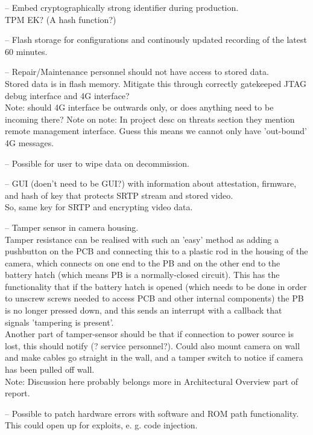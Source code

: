 \documentclass[10pt]{article}
\newenvironment{checklist}{%
  \begin{list}{}{}%
  \let\olditem\item
  \renewcommand\item{\olditem -- \marginpar{$\Box$} }
  \newcommand\checkeditem{\olditem -- \marginpar{$\CheckedBox$} }
}{%
  \end{list}
}
\begin{document}
\begin{checklist}
{      }
      \item{Embed cryptographically strong identifier during production. \\
	TPM EK? (A hash function?)}
      \item{Flash storage for configurations and continously updated recording of the latest 60 minutes.} %
      \item{Repair/Maintenance personnel should not have access to stored data. \\
	Stored data is in flash memory. Mitigate this through correctly gatekeeped JTAG debug interface and 4G interface? \\
	Note: should 4G interface be outwards only, or does anything need to be incoming there?
	Note on note: In project desc on threats section they mention remote management interface. Guess this means we cannot only have 'out-bound' 4G messages.}
      \item{Possible for user to wipe data on decommission.}
      \item{GUI (doen't need to be GUI?) with information about attestation, firmware, and hash of key
        that protects SRTP stream and stored video.\\
	So, same key for SRTP and encrypting video data.}
      \item{Tamper sensor in camera housing. \\
	Tamper resistance can be realised with such an 'easy' method as adding a pushbutton on the PCB and connecting this to a plastic rod in the housing of the camera,
	which connects on one end to the PB and on the other end to the battery hatch (which means PB is a normally-closed circuit). This has the functionality that if
	the battery hatch is opened (which needs to be done in order to unscrew screws needed to access PCB and other internal components)
	the PB is no longer pressed down, and this sends an interrupt with a callback that signals 'tampering is present'. \\
	Another part of tamper-sensor should be that if connection to power source is lost, this should notify (? service personnel?).
	Could also mount camera on wall and make cables go straight in the wall, and a tamper switch to notice if camera has been pulled off wall.\\
	Note: Discussion here probably belongs more in Architectural Overview part of report.}
      \item{Possible to patch hardware errors with software and ROM path
        functionality. \\
	This could open up for exploits, e. g. code injection.
	}
    \end{checklist}
\end{document}
